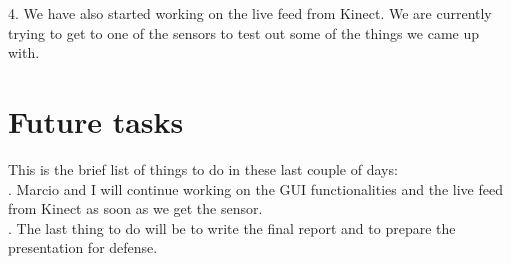 \documentclass[aps,letterpaper,11pt]{revtex4}
\begin{document}
4. We have also started working on the live feed from Kinect. We are currently trying to get to one of the sensors to test out some of the things we came up with.
\pagebreak

\section {Future tasks}
This is the brief list of things to do in these last couple of days:\\
. Marcio and I will continue working on the GUI functionalities and the live feed from Kinect as soon as we get the sensor.\\
. The last thing to do will be to write the final report and to prepare the presentation for defense.\\
\end{document}
